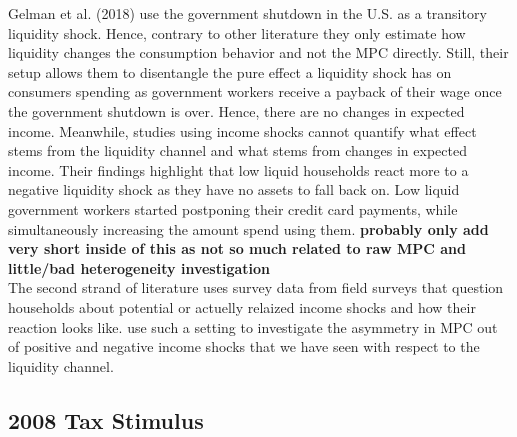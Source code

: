 Gelman et al. (2018) use the government shutdown in the U.S. as a transitory liquidity shock. Hence, contrary to other literature they only estimate how liquidity changes the consumption behavior and not the MPC directly. Still, their setup allows them to disentangle the pure effect a liquidity shock has on consumers spending as government workers receive a payback of their wage once the government shutdown is over. Hence, there are no changes in expected income. Meanwhile, studies using income shocks cannot quantify what effect stems from the liquidity channel and what stems from changes in expected income. Their findings highlight that low liquid households react more to a negative liquidity shock as they have no assets to fall back on. Low liquid government workers started postponing their credit card payments, while simultaneously increasing the amount spend using them. \textbf{probably only add very short inside of this as not so much related to raw MPC and little/bad heterogeneity investigation} \\
The second strand of literature uses survey data from field surveys that question households about potential or actuelly relaized income shocks and how their reaction looks like. \cite{bunn_etal} use such a setting to investigate the asymmetry in MPC out of positive and negative income shocks that we have seen with respect to the liquidity channel. 

\subsection{2008 Tax Stimulus}